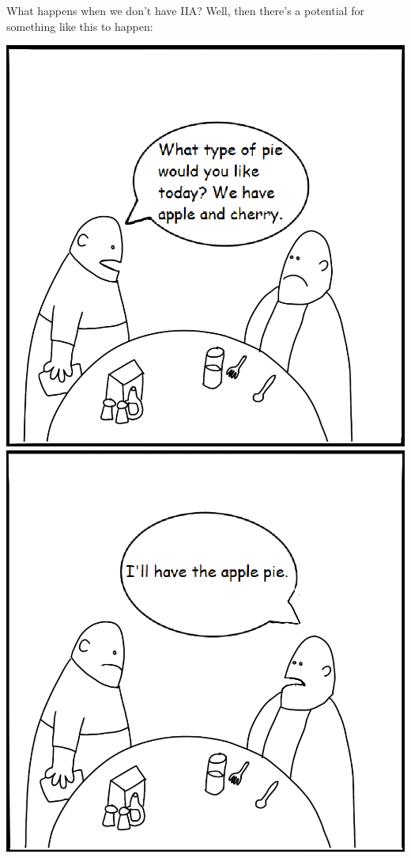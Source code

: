 \documentclass{article}
\begin{document}
\begin{itemize}
What happens when we don’t have IIA? Well, then there’s a potential for something like this to happen:
	\begin{center}
	    \includegraphics[width = \linewidth]{images/minions1.png}
	    \includegraphics[width = \linewidth]{images/minions2.png}

\end{center}
\end{itemize}
\end{document}

